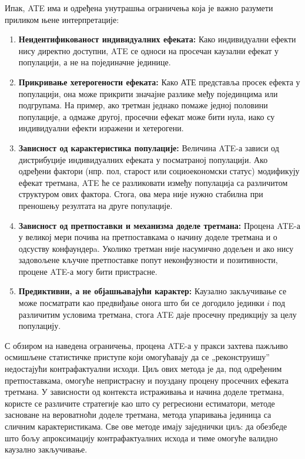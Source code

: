 \documentclass[12pt, a4paper]{article}
\begin{document}
Ипак, ATE има и одређена унутрашња ограничења која је важно разумети приликом њене интерпретације:
\begin{enumerate}
    \item \textbf{Неидентификованост индивидуалних ефеката:}
Како индивидуални ефекти нису директно доступни, ATE се односи на просечан каузални ефекат у популацији, а не на појединачне јединице.
    \item \textbf{Прикривање хетерогености ефеката:}
Како АТЕ представља просек ефекта у популацији, она може прикрити значајне разлике међу појединцима или подгрупама. На пример, ако третман једнако помаже 
једној половини популације, а одмаже другој, просечни ефекат може бити нула, иако су индивидуални ефекти изражени и хетерогени.
    \item \textbf{Зависност од карактеристика популације:}  
Величина ATE-а зависи од дистрибуције индивидуалних ефеката у посматраној популацији. Ако одређени фактори (нпр. пол, старост или социоекономски статус) модификују 
ефекат третмана, ATE ће се разликовати између популација са различитом структуром ових фактора. Стога, ова мера није нужно стабилна при преношењу резултата на друге 
популације.
    \item \textbf{Зависност од претпоставки и механизма доделе третмана:}  
Процена ATE-а у великој мери почива на претпоставкама о начину доделе третмана и о одсуству конфаундерa. Уколико третман није насумично додељен и ако нису 
задовољене кључне претпоставке попут неконфузности и позитивности, процене ATE-а могу бити пристрасне.
    \item \textbf{Предиктивни, а не објашњавајући карактер:}  
Каузално закључивање се може посматрати као предвиђање онога што би се догодило јединки $i$ под различитим условима третмана, стога ATE даје просечну предикцију за 
целу популацију.
\end{enumerate}

С обзиром на наведена ограничења, процена ATE-а у пракси захтева пажљиво осмишљене статистичке приступе који омогућавају да се „реконструишу” недостајући 
контрафактуални исходи. Циљ ових метода је да, под одређеним претпоставкама, омогуће непристрасну и 
поуздану процену просечних ефеката третмана. У зависности од контекста истраживања и начина доделе третмана, користе се различите стратегије као што су 
регресиони естиматори, методе засноване на вероватноћи доделе третмана, метода упаривања јединица са сличним карактеристикама. Све ове методе имају 
заједнички циљ: да обезбеде што бољу апроксимацију контрафактуалних исхода и тиме омогуће валидно каузално закључивање.
\end{document}

